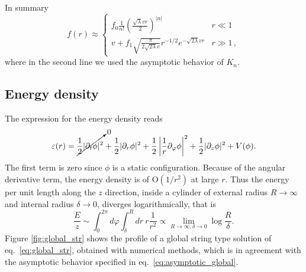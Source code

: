 In summary
\begin{equation}
	\label{eq:asymptotic_global}
	f(r) \approx \begin{cases}
		\displaystyle f_0 \frac{1}{n!}\left(\frac{\sqrt{\lambda}vr}{2}\right)^{|n|}& r \ll 1 \\
	\displaystyle v+f_1\sqrt{\frac{\pi}{2\sqrt{2\lambda}v}}r^{-1/2}e^{-\sqrt{2\lambda}vr} & r \gg 1\, ,
				\end{cases}
\end{equation}
where in the second line we used the asymptotic behavior of $K_n$. %
\subsection{Energy density}
The expression for the energy density reads
\begin{equation}
	\label{eq:energy_density}
	\varepsilon(r) = \cancelto{0}{\frac{1}{2}|\partial_t \phi|^2} +\frac{1}{2}|\partial_r \phi|^2 + \frac{1}{2}\left|\frac{1}{r}\partial_{\varphi} \phi \right|^2 +\frac{1}{2}|\partial_z \phi|^2   + V(\phi).
\end{equation}
The first term is zero since $\phi$ is a static configuration.
Because of the angular derivative term, the energy density is of O$(1/r^2)$ at large $r$. Thus the energy per unit length along the $z$ direction, inside a cylinder of external radius $R\to \infty$ and internal radius $\delta\to 0$, diverges logarithmically, that is
\begin{equation}
	\frac{E}{z} \sim \int_{0}^{2\pi}d\varphi \int_{\delta}^{R}  dr  \ r\frac{1}{r^2} \propto \lim_{R\to\infty, \delta\to 0}\log \frac{R}{\delta} .
\end{equation}
Figure \ref{fig:global_str} shows the profile of a global string type solution of eq.\ \eqref{eq:global_str}, obtained with numerical methods, which is in agreement with the asymptotic behavior specified in eq.\ \eqref{eq:asymptotic_global}. 

